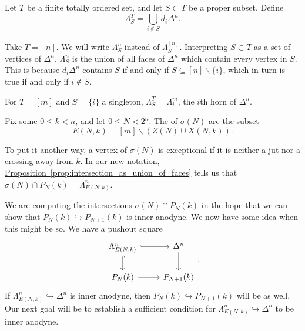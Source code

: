 \documentclass[main.tex]{subfiles}
\begin{document}
\begin{notation}
  Let $T$ be a finite totally ordered set, and let $S \subset T$ be a proper subset. Define
  \begin{equation*}
    \Lambda^{T}_{S} = \bigcup_{i \notin S} d_{i} \Delta^{n}.
  \end{equation*}
\end{notation}

Take $T = [n]$. We will write $\Lambda^{n}_{S}$ instead of $\Lambda^{[n]}_{S}$. Interpreting $S \subset T$ as a set of vertices of $\Delta^{n}$, $\Lambda^{n}_{S}$ is the union of all faces of $\Delta^{n}$ which contain every vertex in $S$. This is because $d_{i}\Delta^{n}$ contains $S$ if and only if $S \subseteq [n] \smallsetminus \{i\}$, which in turn is true if and only if $i \notin S$.


\begin{example}
  For $T = [m]$ and $S = \{i\}$ a singleton, $\Lambda^{T}_{S} = \Lambda^{m}_{i}$, the $i$th horn of $\Delta^{n}$.
\end{example}

\begin{definition}
  Fix some $0 \leq k < n$, and let $0 \leq N < 2^{n}$. The  of $\sigma(N)$ are the subset
  \begin{equation*}
    E(N, k) = [m] \smallsetminus (Z(N) \cup X(N, k)).
  \end{equation*}
\end{definition}

To put it another way, a vertex of $\sigma(N)$ is exceptional if it is neither a jut nor a crossing away from $k$. In our new notation, \hyperref[prop:intersection_as_union_of_faces]{Proposition~\ref*{prop:intersection_as_union_of_faces}} tells us that $\sigma(N) \cap P_{N}(k) = \Lambda^{n}_{E(N, k)}$.

We are computing the intersections $\sigma(N) \cap P_{N}(k)$ in the hope that we can show that $P_{N}(k) \hookrightarrow P_{N+1}(k)$ is inner anodyne. We now have some idea when this might be so. We have a pushout square
\begin{equation*}
  \begin{tikzcd}
    \Lambda^{n}_{E(N, k)}
    \arrow[r, hook]
    \arrow[d, hook]
    & \Delta^{n}
    \arrow[d, hook]
    \\
    P_{N}(k)
    \arrow[r, hook]
    & P_{N+1}(k)
  \end{tikzcd}.
\end{equation*}
If $\Lambda^{n}_{E(N, k)} \hookrightarrow \Delta^{n}$ is inner anodyne, then $P_{N}(k) \hookrightarrow P_{N+1}(k)$ will be as well. Our next goal will be to establish a sufficient condition for $\Lambda^{n}_{E(N, k)} \hookrightarrow \Delta^{n}$ to be inner anodyne.
\end{document}
